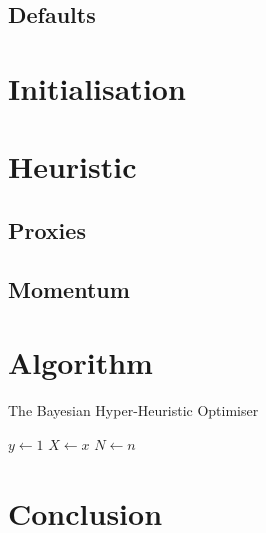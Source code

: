 \subsection{Defaults}
\label{sec:bhh:hyper_parameters:defaults}

\section{Initialisation}
\label{sec:bhh:initialisation}

\section{Heuristic}
\label{sec:bhh:heuristic}

\subsection{Proxies}
\label{sec:bhh:heuristic:proxies}

\subsection{Momentum}
\label{sec:bhh:heuristic:momentum}

\section{Algorithm}
\label{sec:bhh:algorithm}

\begin{algorithm}[H]
\caption{The  Bayesian Hyper-Heuristic Optimiser
}
\label{algo:bhh}


$y \gets 1$\;
$X \gets x$\;
$N \gets n$\;

\end{algorithm}


\section{Conclusion}
\label{sec:bhh:conclusion}

